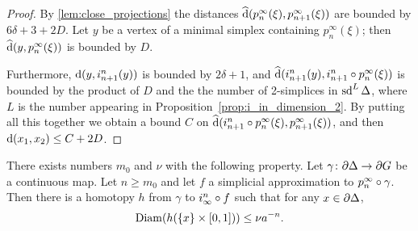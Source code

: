 \documentclass[a4paper]{article}
\begin{document}
\begin{proof}
  By \cref{lem:close_projections} the distances $\operatorname{\widehat{d}}(p^\infty_n(\xi),
  p^\infty_{n+1}(\xi))$ are bounded by $6\delta + 3 + 2D$. Let $y$ be a vertex
  of a minimal simplex containing $p^\infty_n(\xi)$; then $\operatorname{\widehat{d}}(y,
  p^\infty_n(\xi))$ is bounded by $D$.
  
  Furthermore, $\operatorname{d}(y, i^n_{n+1}(y))$ is bounded by $2\delta+1$, and
  $\operatorname{\widehat{d}}(i^n_{n+1}(y), i^n_{n+1}\circ p^\infty_n (\xi))$ is bounded by
  the product of $D$ and the the number of 2-simplices in $\operatorname{sd}^L\Delta$, where
  $L$ is the number appearing in Proposition~\ref{prop:i_in_dimension_2}.  By
  putting all this together we obtain a bound $C$ on
  $\operatorname{\widehat{d}}(i^n_{n+1}\circ p^\infty_n(\xi), p^\infty_{n+1}(\xi))$, and then
  $\operatorname{d}(x_1, x_2) \leq C + 2D$.
\end{proof}

\begin{proposition}\label{prop:uniform_homotopies}
  There exists numbers $m_0$ and $\nu$ with the following property. Let
  $\gamma\colon\partial\Delta\to\partial G$ be a continuous map. Let $n \geq
  m_0$ and let $f$ a simplicial approximation to $p^\infty_n\circ\gamma$.
  Then there is a homotopy $h$ from $\gamma$ to $i^n_\infty\circ f$ such
  that for any $x \in \partial\Delta$,
  \begin{equation*}
    \operatorname{Diam}(h(\{x\}\times [0,1])) \leq \nu a^{-n}.
  \end{equation*}
\end{proposition}
\end{document}
